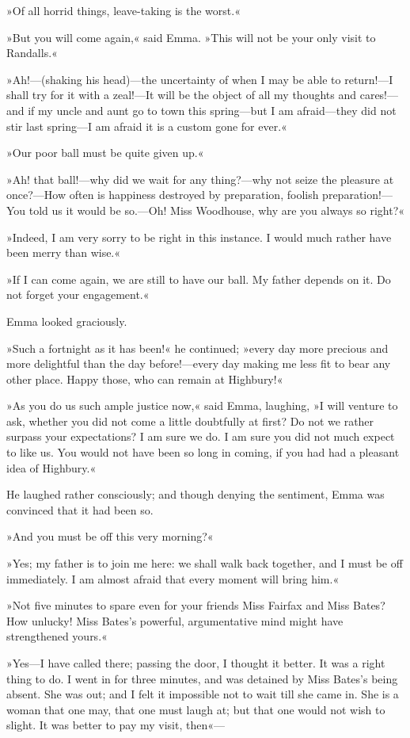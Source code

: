 »Of all horrid things, leave-taking is the worst.«

»But you will come again,« said Emma. »This will not be your only visit to Randalls.«

»Ah!—(shaking his head)—the uncertainty of when I may be able to return!—I shall try for it with a zeal!—It will be the object of all my thoughts and cares!—and if my uncle and aunt go to town this spring—but I am afraid—they did not stir last spring—I am afraid it is a custom gone for ever.«

»Our poor ball must be quite given up.«

»Ah! that ball!—why did we wait for any thing?—why not seize the pleasure at once?—How often is happiness destroyed by preparation, foolish preparation!—You told us it would be so.—Oh! Miss Woodhouse, why are you always so right?«

»Indeed, I am very sorry to be right in this instance. I would much rather have been merry than wise.«

»If I can come again, we are still to have our ball. My father depends on it. Do not forget your engagement.«

Emma looked graciously.

»Such a fortnight as it has been!« he continued; »every day more precious and more delightful than the day before!—every day making me less fit to bear any other place. Happy those, who can remain at Highbury!«

»As you do us such ample justice now,« said Emma, laughing, »I will venture to ask, whether you did not come a little doubtfully at first? Do not we rather surpass your expectations? I am sure we do. I am sure you did not much expect to like us. You would not have been so long in coming, if you had had a pleasant idea of Highbury.«

He laughed rather consciously; and though denying the sentiment, Emma was convinced that it had been so.

»And you must be off this very morning?«

»Yes; my father is to join me here: we shall walk back together, and I must be off immediately. I am almost afraid that every moment will bring him.«

»Not five minutes to spare even for your friends Miss Fairfax and Miss Bates? How unlucky! Miss Bates's powerful, argumentative mind might have strengthened yours.«

»Yes—I have called there; passing the door, I thought it better. It was a right thing to do. I went in for three minutes, and was detained by Miss Bates's being absent. She was out; and I felt it impossible not to wait till she came in. She is a woman that one may, that one must laugh at; but that one would not wish to slight. It was better to pay my visit, then«—

